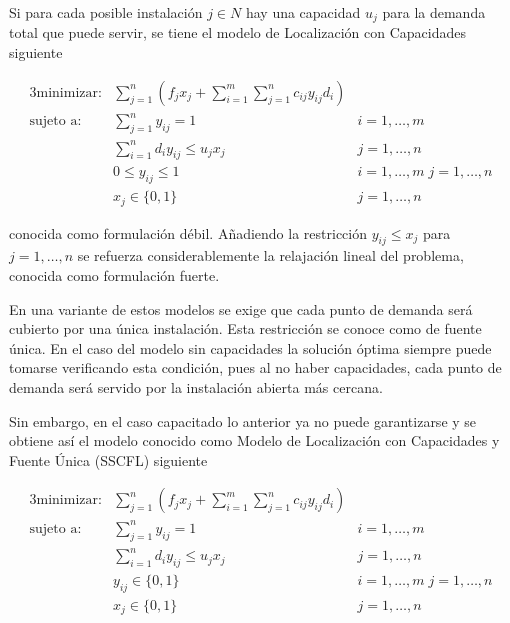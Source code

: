 \vspace*{2mm}

Si para cada posible instalación $j\in N$ hay una capacidad $u_j$ para la demanda total que puede servir, se tiene el modelo 
de Localización con Capacidades siguiente

\begin{alignat}{3}
    \text{minimizar:}   & \sum_{j=1}^n(f_{j}x_{j} + \sum_{i=1}^m\sum_{j=1}^n c_{ij}y_{ij}d_i)   &                           \\
    \text{sujeto a:}    & \sum_{j=1}^ny_{ij}=1                                                  & i=1,\dots,m               \\
                        & \sum_{i=1}^nd_iy_{ij}\leq u_jx_j                                      & j=1,\dots,n               \\
                        & 0\leq y_{ij}\leq 1                                                    & i=1,\dots,m\; j=1,\dots,n \\
                        & x_{j}\in\{0,1\}                                                       & j=1,\dots,n
\end{alignat}

\noindent conocida como formulación débil. Añadiendo la restricción $y_{ij}\leq x_j$ para $j=1,\dots,n$ se refuerza
considerablemente la relajación lineal del problema, conocida como formulación fuerte.

En una variante de estos modelos se exige que cada punto de demanda será cubierto por una única instalación. Esta restricción
se conoce como de fuente única. En el caso del modelo sin capacidades la solución óptima siempre puede tomarse verificando
esta condición, pues al no haber capacidades, cada punto de demanda será servido por la instalación abierta más cercana. 

\newpage

Sin embargo, en el caso capacitado lo anterior ya no puede garantizarse y se obtiene así el modelo conocido como Modelo de
Localización con Capacidades y Fuente Única (SSCFL) siguiente

\begin{alignat}{3}
    \text{minimizar:}   & \sum_{j=1}^n(f_{j}x_{j} + \sum_{i=1}^m\sum_{j=1}^n c_{ij}y_{ij}d_i)   &                           \\
    \text{sujeto a:}    & \sum_{j=1}^ny_{ij}=1                                                  & i=1,\dots,m               \\
                        & \sum_{i=1}^nd_iy_{ij}\leq u_jx_j                                      & j=1,\dots,n               \\
                        & y_{ij}\in\{0,1\}                                                      & i=1,\dots,m\; j=1,\dots,n \\
                        & x_{j}\in\{0,1\}                                                       & j=1,\dots,n
\end{alignat}

